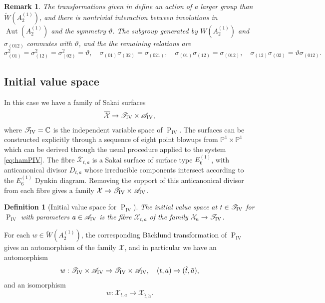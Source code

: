 \documentclass[a4paper,reqno]{amsart}
\numberwithin{equation}{section}
\newcommand{\C}{\mathbb{C}}
\newcommand{\p}{\mathbb{P}}
\newcommand{\pain}[1]{\operatorname{P}_{\mathrm{#1}}}
\DeclareMathOperator{\Aut}{Aut}
\newtheorem{definition}[theorem]{Definition}
\newtheorem{remark}[theorem]{Remark}
\numberwithin{equation}{section}
\begin{document}
    \begin{remark}
        The transformations given in  define an action of a larger group than $\widetilde{W}(A_2^{(1)})$, and there is nontrivial interaction between involutions in $\Aut(A_2^{(1)})$ and the symmetry $\vartheta$. The subgroup generated by $W(A_2^{(1)})$ and $\sigma_{(012)}$ commutes with $\vartheta$, and the the remaining relations are
$$\sigma_{(01)}^2=\sigma_{(12)}^2=\sigma_{(02)}^2 = \vartheta, \quad \sigma_{(01)}\sigma_{(02)}=\sigma_{(021)},\quad \sigma_{(01)}\sigma_{(12)}=\sigma_{(012)}, \quad \sigma_{(12)}\sigma_{(02)}=\vartheta  \sigma_{(012)}.$$
    \end{remark}
    
\subsection{Initial value space}

In this case we have a family of Sakai surfaces 
\begin{equation*}
    \overline{\mathcal{X}} \to \mathscr{T}_{\rm{IV}}\times \mathscr{A}_{\rm{IV}},
\end{equation*}
where $\mathscr{T}_{\rm{IV}} = \C$ is the independent variable space of $\pain{IV}$.
The surfaces can be constructed explicitly through a sequence of eight point blowups from $\p^1 \times\p^1$ which can be derived through the usual procedure applied to the system \eqref{eq:hamPIV}. 
The fibre $\overline{\mathcal{X}}_{t,a}$ is a Sakai surface of surface type $E_6^{(1)}$, with anticanonical divisor $D_{t,a}$ whose irreducible components intersect according to the $E_6^{(1)}$ Dynkin diagram.
Removing the support of this anticanonical divisor from each fibre gives a family $\mathcal{X}\to\mathscr{T}_{\rm{IV}}\times \mathscr{A}_{\rm{IV}}$.

\begin{definition}[Initial value space for $\pain{IV}$]
    The initial value space at $t\in\mathscr{T}_{\rm{IV}}$ for $\pain{IV}$ with parameters $a\in \mathscr{A}_{\rm{IV}}$ is the fibre $\mathcal{X}_{t,a}$ of the family $\mathcal{X}_a \to \mathscr{T}_{\rm{IV}}$.
\end{definition}

For each $w \in \widetilde{W}(A_2^{(1)})$, the corresponding B\"acklund transformation of $\pain{IV}$ gives an automorphism of the family $\mathcal{X}$, and in particular we have an automorphism
$$w : \mathscr{T}_{\rm{IV}}\times \mathscr{A}_{\rm{IV}} \to \mathscr{T}_{\rm{IV}}\times \mathscr{A}_{\rm{IV}},\quad (t,a)\mapsto (\tilde{t},\tilde{a}),$$
and an isomorphism
$$w : \mathcal{X}_{t,a}\to \mathcal{X}_{\tilde{t},\tilde{a}}.$$
\end{document}

